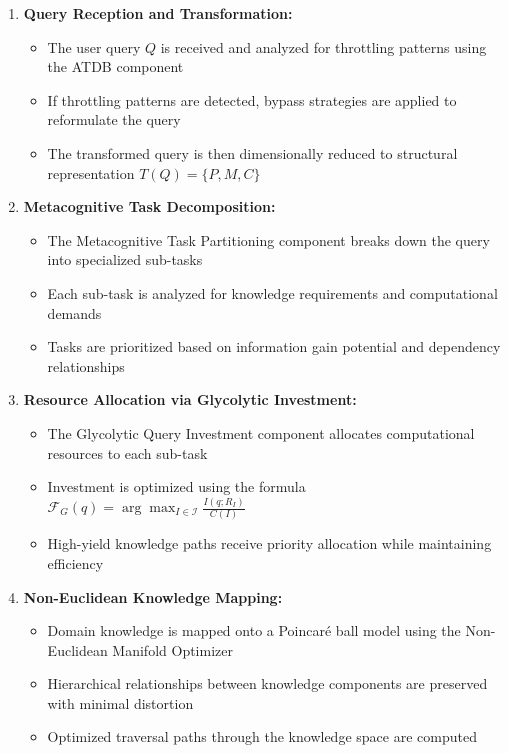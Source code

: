 \documentclass[journal,onecolumn]{IEEEtran}
\begin{document}
\begin{enumerate}
\item \textbf{Query Reception and Transformation:} 
\begin{itemize}
    \item The user query $Q$ is received and analyzed for throttling patterns using the ATDB component
    \item If throttling patterns are detected, bypass strategies are applied to reformulate the query
    \item The transformed query is then dimensionally reduced to structural representation $T(Q) = \{P, M, C\}$
\end{itemize}

\item \textbf{Metacognitive Task Decomposition:} 
\begin{itemize}
    \item The Metacognitive Task Partitioning component breaks down the query into specialized sub-tasks
    \item Each sub-task is analyzed for knowledge requirements and computational demands
    \item Tasks are prioritized based on information gain potential and dependency relationships
\end{itemize}

\item \textbf{Resource Allocation via Glycolytic Investment:} 
\begin{itemize}
    \item The Glycolytic Query Investment component allocates computational resources to each sub-task
    \item Investment is optimized using the formula $\mathcal{F}_G(q) = \arg\max_{I \in \mathcal{I}} \frac{I(q; R_I)}{C(I)}$
    \item High-yield knowledge paths receive priority allocation while maintaining efficiency
\end{itemize}

\item \textbf{Non-Euclidean Knowledge Mapping:} 
\begin{itemize}
    \item Domain knowledge is mapped onto a Poincaré ball model using the Non-Euclidean Manifold Optimizer
    \item Hierarchical relationships between knowledge components are preserved with minimal distortion
    \item Optimized traversal paths through the knowledge space are computed
\end{itemize}


\end{enumerate}
\end{document}
